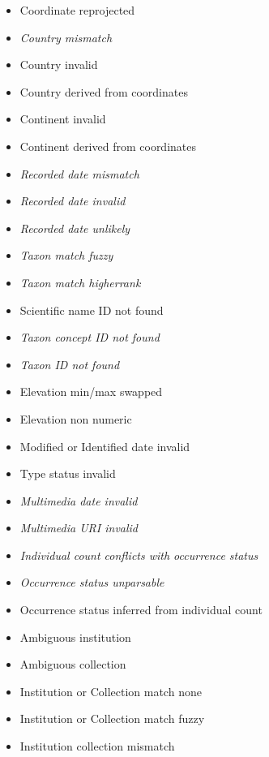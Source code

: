 \documentclass[
]{article}
\providecommand{\tightlist}{%
  \setlength{\itemsep}{0pt}\setlength{\parskip}{0pt}}
\begin{document}
\begin{itemize}
  \begin{itemize}
  \tightlist
  \item
    Coordinate reprojected
  \item
    \emph{Country mismatch}
  \item
    Country invalid
  \item
    Country derived from coordinates
  \item
    Continent invalid
  \item
    Continent derived from coordinates
  \item
    \emph{Recorded date mismatch}
  \item
    \emph{Recorded date invalid}
  \item
    \emph{Recorded date unlikely}
  \item
    \emph{Taxon match fuzzy}
  \item
    \emph{Taxon match higherrank}
  \item
    Scientific name ID not found
  \item
    \emph{Taxon concept ID not found}
  \item
    \emph{Taxon ID not found}
  \item
    Elevation min/max swapped
  \item
    Elevation non numeric
  \item
    Modified or Identified date invalid
  \item
    Type status invalid
  \item
    \emph{Multimedia date invalid}
  \item
    \emph{Multimedia URI invalid}
  \item
    \emph{Individual count conflicts with occurrence status}
  \item
    \emph{Occurrence status unparsable}
  \item
    Occurrence status inferred from individual count
  \item
    Ambiguous institution
  \item
    Ambiguous collection
  \item
    Institution or Collection match none
  \item
    Institution or Collection match fuzzy
  \item
    Institution collection mismatch
  \end{itemize}
\end{itemize}
\end{document}
